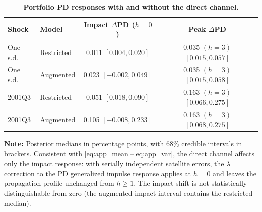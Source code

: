 \begin{table}[!htbp]
\centering
\scriptsize
\caption{\textbf{Portfolio PD responses with and without the direct channel.}}
\label{tab:direct_channel_pd}
\begin{tabular}{llcc}
\toprule
Shock & Model & Impact $\Delta$PD ($h=0$) & Peak $\Delta$PD \\
\midrule
One s.d. & Restricted & 0.011 $[0.004, 0.020]$ & 0.035 $(h=3)$ $[0.015, 0.057]$ \\
One s.d. & Augmented & 0.023 $[-0.002, 0.049]$ & 0.035 $(h=3)$ $[0.015, 0.058]$ \\
\midrule
2001Q3 & Restricted & 0.051 $[0.018, 0.090]$ & 0.163 $(h=3)$ $[0.066, 0.275]$ \\
2001Q3 & Augmented & 0.105 $[-0.008, 0.233]$ & 0.163 $(h=3)$ $[0.068, 0.275]$ \\
\bottomrule
\end{tabular}
\par\medskip
\begin{minipage}{0.92\textwidth}
\footnotesize
\textbf{Note:} Posterior medians in percentage points, with $68\%$ credible
intervals in brackets. Consistent with \eqref{eq:app_mean}--\eqref{eq:app_var},
the direct channel affects only the impact response: with serially independent
satellite errors, the $\lambda$ correction to the PD generalized impulse
response applies at $h=0$ and leaves the propagation profile unchanged from
$h\ge1$. The impact shift is not statistically distinguishable from zero (the
augmented impact interval contains the restricted median).
\end{minipage}
\end{table}
